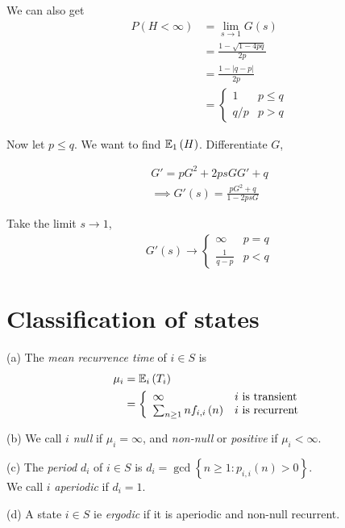 \documentclass[a4paper]{article}
\begin{document}
\begin{eg}
We can also get
\begin{equation*}
\begin{aligned}
P\left(H<\infty\right) &= \lim_{s \to 1} G\left(s\right)\\
&= \frac{1-\sqrt{1-4pq}}{2p}\\
&= \frac{1-|q-p|}{2p}\\
&= \left\{\begin{array}{ll}
1 & p\leq q\\
q/p & p>q
\end{array}
\right.
\end{aligned}
\end{equation*}

Now let $p\leq q$. We want to find $\mathbb{E}_1\left(H\right)$. Differentiate $G$,

\begin{equation*}
\begin{aligned}
G'=pG^2+2psGG'+q\\
\implies G'\left(s\right) = \frac{pG^2+q}{1-2psG}
\end{aligned}
\end{equation*}

Take the limit $s \to 1$,
\begin{equation*}
\begin{aligned}
G'\left(s\right) \to \left\{ \begin{array}{ll}
\infty & p=q\\
\frac{1}{q-p} & p<q
\end{array}
\right.
\end{aligned}
\end{equation*}

\end{eg}

\newpage

\section{Classification of states}

\begin{defi}
(a) The \emph{mean recurrence time} of $i\in S$ is 
\begin{equation*}
\begin{aligned}
\mu_i &= \mathbb{E}_i\left(T_i\right)\\
&=\left\{\begin{array}{ll}
\infty & i \text{ is transient}\\
\sum_{n\geq 1} n f_{i,i}\left(n\right) & i \text{ is recurrent}
\end{array}
\right.
\end{aligned}
\end{equation*}

(b) We call $i$ \emph{null} if $\mu_i = \infty$, and \emph{non-null} or \emph{positive} if $\mu_i < \infty$.

(c) The \emph{period} $d_i$ of $i \in S$ is $d_i = \gcd\left\{ n \geq 1 : p_{i,i} \left(n\right) > 0\right\}$.\\
We call $i$ \emph{aperiodic} if $d_i = 1$.

(d) A state $i \in S$ ie \emph{ergodic} if it is aperiodic and non-null recurrent.
\end{defi}
\end{document}
